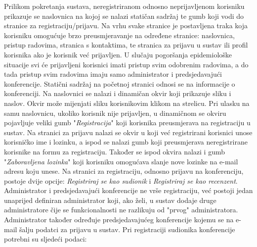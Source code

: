 		Prilikom pokretanja sustava, neregistriranom odnosno neprijavljenom korisniku prikazuje se naslovnica na kojoj se nalazi statičan sadržaj te gumb koji vodi do stranice za registraciju/prijavu. Na vrhu svake stranice  je postavljena traka koja korisniku omogućuje brzo preusmjeravanje na određene stranice: naslovnica, pristup radovima, stranica s kontaktima, te stranica za prijavu u sustav ili profil korisnika ako je korisnik već prijavljen. U slučaju pogoršanja epidemiološke situacije svi će prijavljeni korisnici imati pristup svim odobrenim radovima, a do tada pristup svim radovima imaju samo administrator i predsjedavajući konferencije. Statični sadržaj na početnoj stranici odnosi se na informacije o konferenciji. Na naslovnici se nalazi i dinamičan okvir koji prikazuje sliku i naslov. Okvir može mijenjati sliku korisnikovim klikom na strelicu. Pri ulasku na samu naslovnicu, ukoliko korisnik nije prijavljen, u dinamičnom se okviru pojavljuje veliki gumb "\textit{Registracija}" koji korisnika preusmjerava na registraciju u sustav. 
		\newline
		\newline
		Na stranici za prijavu nalazi se okvir u koji već registrirani korisnici unose korisničko ime i lozinku, a ispod se nalazi gumb koji preusmjerava neregistrirane korisnike na formu za registraciju. Također se ispod okvira nalazi i gumb "\textit{Zaboravljena lozinka}" koji korisniku omogućava slanje nove lozinke na e-mail adresu koju unese. Na stranici za registraciju, odnosno prijavu na konferenciju, postoje dvije opcije: \textit{Registriraj se kao sudionik} i \textit{Registriraj se kao recenzent}. Administrator i predsjedavajući konferencije ne vrše registraciju, već postoji jedan unaprijed definiran administrator koji, ako želi, u sustav dodaje druge administratore čije se funkcionalnosti ne razlikuju od "prvog" administratora. Administrator također određuje predsjedavajućeg konferencije kojemu se na e-mail šalju podatci za prijavu u sustav.
		\newline
		\newline
		\indent Pri registraciji sudionika konferencije potrebni su sljedeći podaci:


